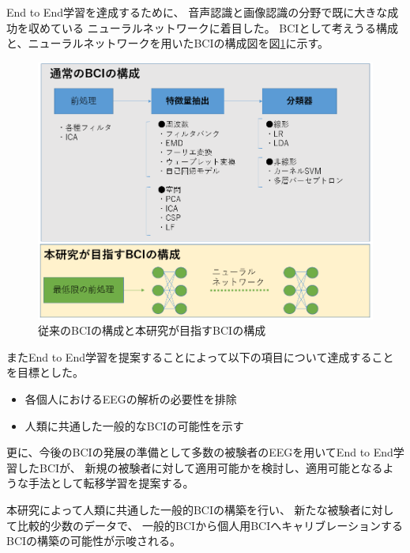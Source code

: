 End to End学習を達成するために、
音声認識と画像認識の分野で既に大きな成功を収めている
ニューラルネットワークに着目した。
BCIとして考えうる構成と、ニューラルネットワークを用いたBCIの構成図を図\ref{fig:BCIpattern}に示す。
\begin{figure}
    \centering
    \includegraphics[width=12cm]{images/BCIpattern.PNG}
    \caption{従来のBCIの構成と本研究が目指すBCIの構成}
    \label{fig:BCIpattern}
\end{figure}
またEnd to End学習を提案することによって以下の項目について達成することを目標とした。
\begin{itemize}
    \item 各個人におけるEEGの解析の必要性を排除
    \item 人類に共通した一般的なBCIの可能性を示す
\end{itemize}
更に、今後のBCIの発展の準備として多数の被験者のEEGを用いてEnd to End学習したBCIが、
新規の被験者に対して適用可能かを検討し、適用可能となるような手法として転移学習\cite{転移学習}を提案する。

本研究によって人類に共通した一般的BCIの構築を行い、
新たな被験者に対して比較的少数のデータで、
一般的BCIから個人用BCIへキャリブレーションするBCIの構築の可能性が示唆される。







